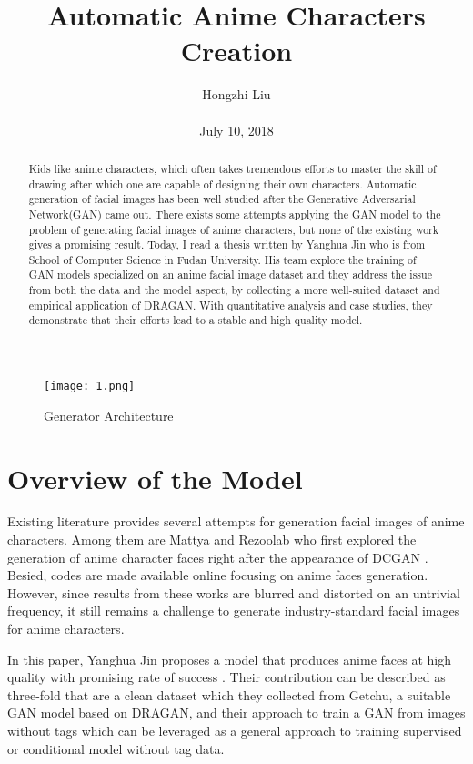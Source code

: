 \documentclass[10pt,twocolumn,letterpaper]{article}
\title{Automatic Anime Characters Creation}
\author{Hongzhi Liu\\\\
July 10, 2018}
\begin{document}
\maketitle
\begin{abstract}
	Kids like anime characters, which often takes tremendous efforts to master the skill of drawing after which one are capable of designing their own characters. Automatic generation of facial images has been well studied after the Generative Adversarial Network(GAN) came out. There exists some attempts applying the GAN model to the problem of generating facial images of anime characters, but none of the existing work gives a promising result. Today, I read a thesis written by Yanghua Jin who is from School of Computer Science in Fudan University. His team explore the training of GAN models specialized on an anime facial image dataset and they address the issue from both the data and the model aspect, by collecting a more well-suited dataset and empirical application of DRAGAN. With quantitative analysis and case studies, they demonstrate that their efforts lead to a stable and high quality model.
\end{abstract}

\begin{figure*}[!b]
	\begin{center}
		\texttt{[image: 1.png]}
	\end{center}
	\caption{Generator Architecture}
	\label{p1}
\end{figure*}

\section{Overview of the Model}

Existing literature provides several attempts for generation facial images of anime characters. Among them are Mattya and Rezoolab who first explored the generation of anime character faces right after the appearance of DCGAN \cite{Radford2015Unsupervised}. Besied, codes are made available online focusing on anime faces generation. However, since results from these works are blurred and distorted on an untrivial frequency, it still remains a challenge to generate industry-standard facial images for anime characters.

In this paper, Yanghua Jin proposes a model that produces anime faces at high quality with promising rate of success \cite{Jin2017Towards}. Their contribution can be described as three-fold that are a clean dataset which they collected from Getchu, a suitable GAN model based on DRAGAN, and their approach to train a GAN from images without tags which can be leveraged as a general approach to training supervised or conditional model without tag data.
\end{document}
